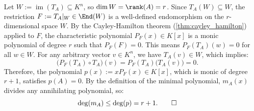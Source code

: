 \begin{exercisesolution}
\label{sol:degree_minimal_poly_bounded_by_rank}
Let $W := \operatorname{im}(T_A) \subseteq K^n$, so $\dim W = \rank(A) = r$.
Since $T_A(W) \subseteq W$, the restriction $F := T_A|_W \in \End(W)$ is a well-defined endomorphism on the $r$-dimensional space $W$.
By the Cayley-Hamilton theorem (\cref{thm:cayley_hamilton}) applied to $F$, the characteristic polynomial $P_F(x) \in K[x]$ is a monic polynomial of degree $r$ such that $P_F(F) = 0$.
This means $P_F(T_A)(w) = 0$ for all $w \in W$.
For any arbitrary vector $v \in K^n$, we have $T_A(v) \in W$, which implies:
\[
\big(P_F(T_A) \circ T_A\big)(v) = P_F(T_A)\big(T_A(v)\big) = 0.
\]
Therefore, the polynomial $p(x) := x P_F(x) \in K[x]$, which is monic of degree $r + 1$, satisfies $p(A) = 0$.
By the definition of the minimal polynomial, $m_A(x)$ divides any annihilating polynomial, so:
\[
\deg(m_A) \le \deg(p) = r + 1. \qedhere
\]
\end{exercisesolution}


